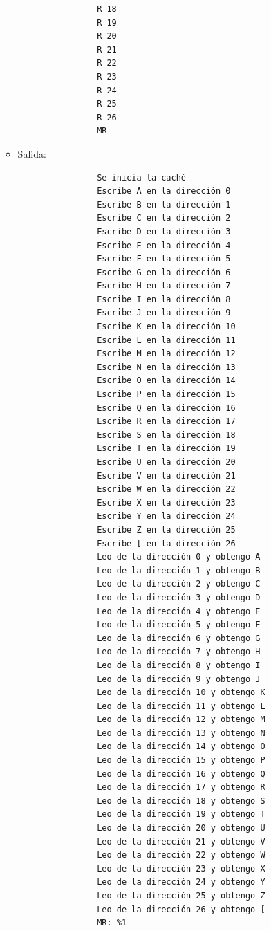 \documentclass[titlepage,a4paper]{article}
\begin{document}
\begin{itemize}
\begin{itemize}
\begin{verbatim}
                R 18
                R 19
                R 20
                R 21
                R 22
                R 23
                R 24
                R 25
                R 26
                MR
            \end{verbatim}
        \item Salida:
            \begin{verbatim}
                Se inicia la caché
                Escribe A en la dirección 0
                Escribe B en la dirección 1
                Escribe C en la dirección 2
                Escribe D en la dirección 3
                Escribe E en la dirección 4
                Escribe F en la dirección 5
                Escribe G en la dirección 6
                Escribe H en la dirección 7
                Escribe I en la dirección 8
                Escribe J en la dirección 9
                Escribe K en la dirección 10
                Escribe L en la dirección 11
                Escribe M en la dirección 12
                Escribe N en la dirección 13
                Escribe O en la dirección 14
                Escribe P en la dirección 15
                Escribe Q en la dirección 16
                Escribe R en la dirección 17
                Escribe S en la dirección 18
                Escribe T en la dirección 19
                Escribe U en la dirección 20
                Escribe V en la dirección 21
                Escribe W en la dirección 22
                Escribe X en la dirección 23
                Escribe Y en la dirección 24
                Escribe Z en la dirección 25
                Escribe [ en la dirección 26
                Leo de la dirección 0 y obtengo A
                Leo de la dirección 1 y obtengo B
                Leo de la dirección 2 y obtengo C
                Leo de la dirección 3 y obtengo D
                Leo de la dirección 4 y obtengo E
                Leo de la dirección 5 y obtengo F
                Leo de la dirección 6 y obtengo G
                Leo de la dirección 7 y obtengo H
                Leo de la dirección 8 y obtengo I
                Leo de la dirección 9 y obtengo J
                Leo de la dirección 10 y obtengo K
                Leo de la dirección 11 y obtengo L
                Leo de la dirección 12 y obtengo M
                Leo de la dirección 13 y obtengo N
                Leo de la dirección 14 y obtengo O
                Leo de la dirección 15 y obtengo P
                Leo de la dirección 16 y obtengo Q
                Leo de la dirección 17 y obtengo R
                Leo de la dirección 18 y obtengo S
                Leo de la dirección 19 y obtengo T
                Leo de la dirección 20 y obtengo U
                Leo de la dirección 21 y obtengo V
                Leo de la dirección 22 y obtengo W
                Leo de la dirección 23 y obtengo X
                Leo de la dirección 24 y obtengo Y
                Leo de la dirección 25 y obtengo Z
                Leo de la dirección 26 y obtengo [
                MR: %1
            \end{verbatim}
    \end{itemize}
\end{itemize}
\end{document}
